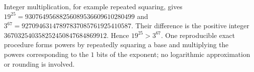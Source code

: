 Integer multiplication, for example repeated squaring, gives $19^{25}=93076495688256089536609610280499$ and $3^{67}=92709463147897837085761925410587$. Their difference is the positive integer $367032540358252450847684869912$. Hence $\boxed{19^{25}>3^{67}}$. One reproducible exact procedure forms powers by repeatedly squaring a base and multiplying the powers corresponding to the $1$ bits of the exponent; no logarithmic approximation or rounding is involved.
